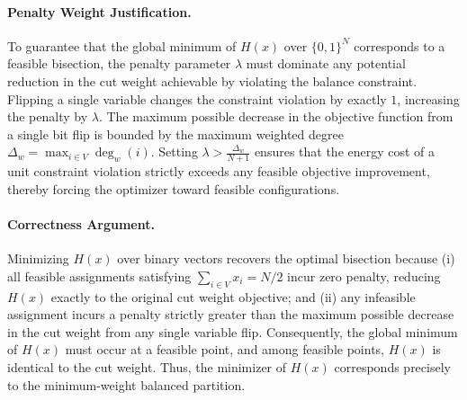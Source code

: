 \documentclass[12pt]{article}
\begin{document}
\paragraph{Penalty Weight Justification.}
To guarantee that the global minimum of $H(x)$ over $\{0,1\}^N$ corresponds to a feasible bisection, the penalty parameter $\lambda$ must dominate any potential reduction in the cut weight achievable by violating the balance constraint. Flipping a single variable changes the constraint violation by exactly $1$, increasing the penalty by $\lambda$. The maximum possible decrease in the objective function from a single bit flip is bounded by the maximum weighted degree $\Delta_w = \max_{i \in V} \deg_w(i)$. Setting $\lambda > \frac{\Delta_w}{N+1}$ ensures that the energy cost of a unit constraint violation strictly exceeds any feasible objective improvement, thereby forcing the optimizer toward feasible configurations.

\paragraph{Correctness Argument.}
Minimizing $H(x)$ over binary vectors recovers the optimal bisection because (i) all feasible assignments satisfying $\sum_{i \in V} x_i = N/2$ incur zero penalty, reducing $H(x)$ exactly to the original cut weight objective; and (ii) any infeasible assignment incurs a penalty strictly greater than the maximum possible decrease in the cut weight from any single variable flip. Consequently, the global minimum of $H(x)$ must occur at a feasible point, and among feasible points, $H(x)$ is identical to the cut weight. Thus, the minimizer of $H(x)$ corresponds precisely to the minimum-weight balanced partition.
\end{document}
